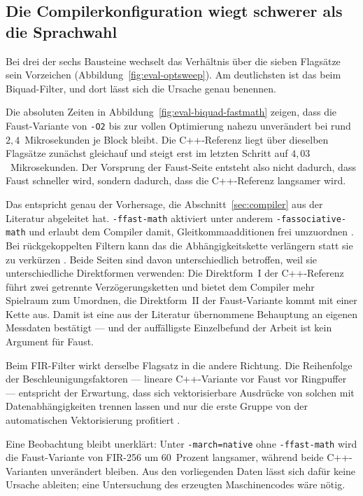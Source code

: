 \subsection{Die Compilerkonfiguration wiegt schwerer als die Sprachwahl}
\label{subsec:disk-compiler}

Bei drei der sechs Bausteine wechselt das Verhältnis über die sieben Flagsätze sein Vorzeichen (Abbildung~\ref{fig:eval-optsweep}). Am deutlichsten ist das beim Biquad-Filter, und dort lässt sich die Ursache genau benennen.

Die absoluten Zeiten in Abbildung~\ref{fig:eval-biquad-fastmath} zeigen, dass die Faust-Variante von \texttt{-O2} bis zur vollen Optimierung nahezu unverändert bei rund $2{,}4$~Mikrosekunden je Block bleibt. Die C++-Referenz liegt über dieselben Flagsätze zunächst gleichauf und steigt erst im letzten Schritt auf $4{,}03$~Mikrosekunden. Der Vorsprung der Faust-Seite entsteht also nicht dadurch, dass Faust schneller wird, sondern dadurch, dass die C++-Referenz langsamer wird.

Das entspricht genau der Vorhersage, die Abschnitt~\ref{sec:compiler} aus der Literatur abgeleitet hat. \texttt{-ffast-math} aktiviert unter anderem \texttt{-fassociative-math} und erlaubt dem Compiler damit, Gleitkommaadditionen frei umzuordnen \parencite{gcc13manual}. Bei rückgekoppelten Filtern kann das die Abhängigkeitskette verlängern statt sie zu verkürzen \parencite{parhi1999vlsi}. Beide Seiten sind davon unterschiedlich betroffen, weil sie unterschiedliche Direktformen verwenden: Die Direktform~I der C++-Referenz führt zwei getrennte Verzögerungsketten und bietet dem Compiler mehr Spielraum zum Umordnen, die Direktform~II der Faust-Variante kommt mit einer Kette aus. Damit ist eine aus der Literatur übernommene Behauptung an eigenen Messdaten bestätigt --- und der auffälligste Einzelbefund der Arbeit ist kein Argument für Faust.

Beim FIR-Filter wirkt derselbe Flagsatz in die andere Richtung. Die Reihenfolge der Beschleunigungsfaktoren --- lineare C++-Variante vor Faust vor Ringpuffer --- entspricht der Erwartung, dass sich vektorisierbare Ausdrücke von solchen mit Datenabhängigkeiten trennen lassen und nur die erste Gruppe von der automatischen Vektorisierung profitiert \parencite{scaringella:hal-02158949}.

Eine Beobachtung bleibt unerklärt: Unter \texttt{-march=native} ohne \texttt{-ffast-math} wird die Faust-Variante von FIR-256 um $60$~Prozent langsamer, während beide C++-Varianten unverändert bleiben. Aus den vorliegenden Daten lässt sich dafür keine Ursache ableiten; eine Untersuchung des erzeugten Maschinencodes wäre nötig.

